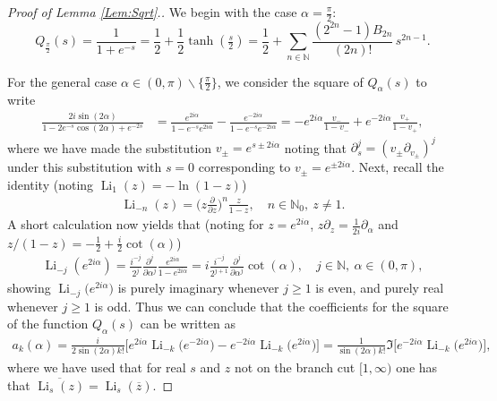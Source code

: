 \documentclass[letterpaper,10pt]{amsart}
\DeclareMathOperator{\Li}{Li}
\numberwithin{equation}{section}
\begin{document}
\begin{proof}[Proof of Lemma \ref{Lem:Sqrt}.]
We begin with the case $\alpha=\tfrac{\pi}{2}$:
\begin{equation}
Q_{\tfrac{\pi}{2}}(s)=\frac{1}{1+e^{-s}}=\frac{1}{2}+\frac{1}{2}\tanh(\tfrac{s}{2})=\frac{1}{2}+\sum_{n\in\mathbb{N}}
\frac{(2^{2n}-1)B_{2n}}{(2n)!}\, s^{2n-1}.
\end{equation}


For the general case $\alpha\in(0,\pi)\backslash\{\tfrac{\pi}{2}\}$, we consider the square of $Q_\alpha(s)$ to write
\begin{align}
\label{eq:2.49}
\frac{2i\sin(2\alpha)}{1-2e^{-s}\cos(2\alpha)+e^{-2s}}&=\frac{e^{2i\alpha}}{1-e^{-s}e^{2i\alpha}}-\frac{e^{-2i\alpha}}{1-e^{-s}e^{-2i\alpha}}=-e^{2i\alpha}\frac{v_-}{1-v_-}+e^{-2i\alpha}\frac{v_+}{1-v_+},
\end{align}
where we have made the substitution $v_\pm=e^{s\pm 2i\alpha}$ noting that $\partial_s^{j}=(v_\pm\partial_{v_\pm} )^{j}$ under this substitution with $s=0$ corresponding to $v_\pm=e^{\pm 2i\alpha}$. Next, recall the identity (noting $\Li_1(z)=-\ln(1-z)$)
\begin{align}\label{Eq:Polylogrec}
\Li_{-n}(z)=\bigg(z\frac{\partial}{\partial z}\bigg)^n \frac{z}{1-z},\quad n\in\mathbb{N}_0,\ z\neq 1.
\end{align}
A short calculation now yields that (noting for $z=e^{2i\alpha}$, $z\partial_z=\frac{1}{2i}\partial_\alpha$ and $z/(1-z)=-\frac{1}{2}+\frac{i}{2}\cot(\alpha)$)
\begin{align}\label{Eq:Polylogid}
\Li_{-j}(e^{2i\alpha})=\frac{i^{-j}}{2^{j}}\frac{\partial^{j}}{\partial\alpha^{j}}\frac{e^{2i\alpha}}{1-e^{2i\alpha}}=i\frac{i^{-j}}{2^{j+1}}\frac{\partial^{j}}{\partial\alpha^{j}}\cot(\alpha),\quad j\in\mathbb{N},\ \alpha\in(0,\pi),
\end{align}
showing $\Li_{-j}\big(e^{2i\alpha}\big)$ is purely imaginary whenever $j\geq1$ is even, and purely real whenever $j\geq1$ is odd.
Thus we can conclude that the coefficients for the square of the function $Q_\alpha(s)$ can be written as
\begin{align}\label{Eq:akmid}
a_k(\alpha)=\frac{i}{2\sin(2\alpha) k!}\big[e^{2i\alpha}\Li_{-k}\big(e^{-2i\alpha}\big)-e^{-2i\alpha}\Li_{-k}\big(e^{2i\alpha}\big)\big]=\frac{1}{\sin(2\alpha) k!}\Im\big[e^{-2i\alpha}\Li_{-k}\big(e^{2i\alpha}\big)\big],
\end{align}
where we have used that for real $s$ and $z$ not on the branch cut $[1,\infty)$ one has that $\overline{\Li_s(z)}=\Li_s(\overline{z})$.

\end{proof}
\end{document}
